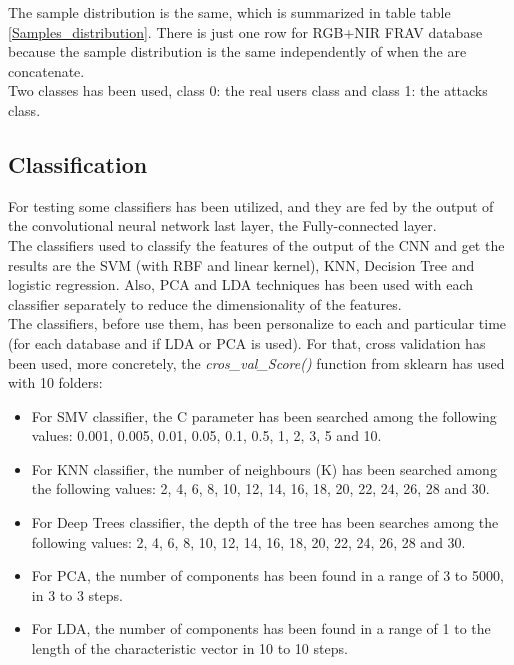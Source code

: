 The sample distribution is the same, which is summarized in table table \ref{Samples_distribution}. There is just one row for RGB+NIR FRAV database because the sample distribution is the same independently of when the are concatenate.\\

Two classes has been used, class 0: the real users class and class 1: the attacks class.

\subsection{Classification}
For testing some classifiers has been utilized, and they are fed by the output of the convolutional neural network last layer, the Fully-connected layer.\\

The classifiers used to classify the features of the output of the CNN and get the results are the SVM (with RBF and linear kernel), KNN, Decision Tree and logistic regression. Also, PCA and LDA techniques has been used with each classifier separately to reduce the dimensionality of the features.\\

The classifiers, before use them, has been personalize to each and particular time (for each database and if LDA or PCA is used). For that, cross validation has been used, more concretely, the \textit{cros\_val\_Score()} function from sklearn has used with 10 folders:
\begin{itemize}
\item For SMV classifier, the C parameter has been searched among the following values: 0.001, 0.005, 0.01, 0.05, 0.1, 0.5, 1, 2, 3, 5 and 10.
\item For KNN classifier, the number of neighbours (K) has been searched among the following values: 2, 4, 6, 8, 10, 12, 14, 16, 18, 20, 22, 24, 26, 28 and 30.
\item For Deep Trees classifier, the depth of the tree has been searches among the following values: 2, 4, 6, 8, 10, 12, 14, 16, 18, 20, 22, 24, 26, 28 and 30.
\item For PCA, the number of components has been found in a range of 3 to 5000, in 3 to 3 steps.
\item For LDA, the number of components has been found in a range of 1 to the length of the characteristic vector in 10 to 10 steps.
\end{itemize}

\clearpage

